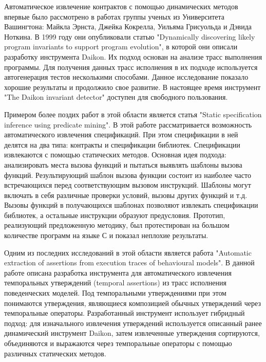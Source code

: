 Автоматическое извлечение контрактов с помощью динамических методов впервые было рассмотрено в работах группы ученых из Университета Вашингтона: Майкла Эрнста, Джейка Кокрелла, Уильяма Грисуольда и Дэвида Ноткина. В 1999 году они опубликовали статью "Dynamically discovering likely program invariants to support program evolution", в которой они описали разработку инструмента Daikon\cite{discoveringInvariants}. Их подход основан на анализе трасс выполнения программы. Для получения данных трасс исполнения в их подходе используется автогенерация тестов несколькими способами. Данное исследование показало хорошие результаты и продолжило свое развитие. В настоящее время инструмент "The Daikon invariant detector" доступен для свободного пользования\cite{daikon}.

Примером более поздих работ в этой области является статья "Static specification inference using predicate mining"\cite{staticPredicateMining}. В этой работе рассматривается возможность автоматического извлечения спецификаций. При этом спецификации в ней делятся на два типа: контракты и спецификации библиотек. Спецификации извлекаются с помощью статических методов. Основная идея подхода: анализировать места вызова функций и пытаться выявлять шаблоны вызова функций. Результирующий шаблон вызова функции состоит из наиболее часто встречающихся перед соответствующим вызовом инструкций. Шаблоны могут включать в себя различные проверки условий, вызовы других функций и т.д. Вызовы функций в получающихся шаблонах позволяют извлекать спецификации библиотек, а остальные инструкции образуют предусловия. Прототип, реализующий предложенную методику, был протестирован на большом количестве программ на языке С и показал неплохие результаты.

Одним из последних исследований в этой области является работа "Automatic extraction of assertions from execution traces of behavioural models"\cite{automiticAssertionsExtraction}. В данной работе описана разработка инструмента для автоматического извлечения темпоральных утверждений (temporal assertions) из трасс исполнения поведенческих моделей. Под темпоральными утверждениями при этом понимаются утверждения, являющиеся композицией обычных утверждений через темпоральные операторы. Разработанный инструмент использует гибридный подход: для изначального извлечения утверждений используется описанный ранее динамический инструмент Daikon, затем извлеченные утверждения сортируются, объединяются и выражаются через темпоральные операторы с помощью различных статических методов.

